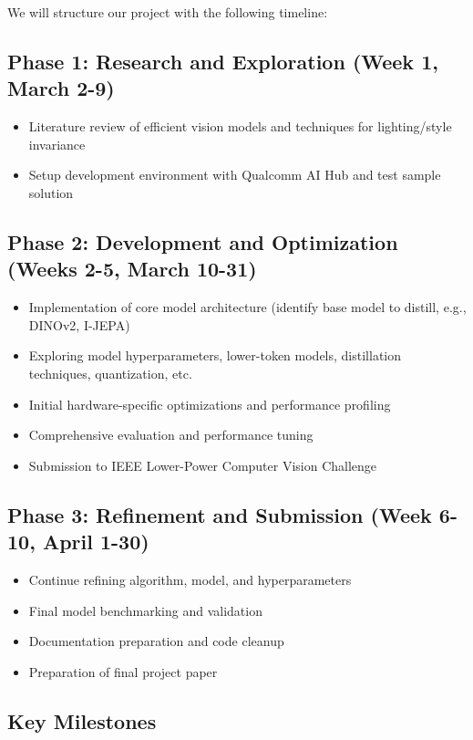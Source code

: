 \documentclass[11pt, oneside]{article}   	%
\begin{document}
We will structure our project with the following timeline:

\subsection*{Phase 1: Research and Exploration (Week 1, March 2-9)}

\begin{itemize}
	\item Literature review of efficient vision models and techniques for lighting/style invariance
	\item Setup development environment with Qualcomm AI Hub and test sample solution
\end{itemize}

\subsection*{Phase 2: Development and Optimization (Weeks 2-5, March 10-31)}

\begin{itemize}
	\item Implementation of core model architecture (identify base model to distill, e.g., DINOv2, I-JEPA)
	\item Exploring model hyperparameters, lower-token models, distillation techniques, quantization, etc.
	\item Initial hardware-specific optimizations and performance profiling
	\item Comprehensive evaluation and performance tuning
	\item Submission to IEEE Lower-Power Computer Vision Challenge
\end{itemize}

\subsection*{Phase 3: Refinement and Submission (Week 6-10, April 1-30)}

\begin{itemize}
	\item Continue refining algorithm, model, and hyperparameters
	\item Final model benchmarking and validation
	\item Documentation preparation and code cleanup
	\item Preparation of final project paper
\end{itemize}

\subsection*{Key Milestones}
\end{document}
